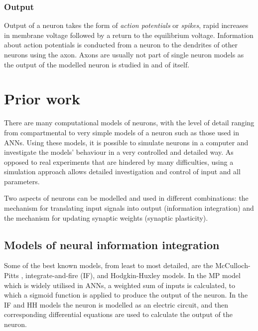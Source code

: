 \documentclass[a4paper,12pt]{report}
\theoremstyle{definition}
\begin{document}
\subsubsection{Output}

Output of a neuron takes the form of \emph{action potentials} or \emph{spikes}, rapid increases in membrane voltage followed by a return to the equilibrium voltage. Information about action potentials is conducted from a neuron to the dendrites of other neurons using the axon. Axons are usually not part of single neuron models as the output of the modelled neuron is studied in and of itself.

\section{Prior work}


There are many computational models of neurons, with the level of detail ranging from compartmental to very simple models of a neuron such as those used in ANNs. Using these models, it is possible to simulate neurons in a computer and investigate the models' behaviour in a very controlled and detailed way. As opposed to real experiments that are hindered by many difficulties, using a simulation approach allows detailed investigation and control of input and all parameters.

Two aspects of neurons can be modelled and used in different combinations: the mechanism for translating input signals into output (information integration) and the mechanism for updating synaptic weights (synaptic plasticity).


\subsection{Models of neural information integration}
\label{modelsofintegration}

Some of the best known models, from least to most detailed, are the McCulloch-Pitts \cite{mcculloch1943logical}, integrate-and-fire (IF), and Hodgkin-Huxley \cite{hodgkin1952quantitative} models. In the MP model which is widely utilised in ANNs, a weighted sum of inputs is calculated, to which a sigmoid function is applied to produce the output of the neuron. In the IF and HH models the neuron is modelled as an electric circuit, and then corresponding differential equations are used to calculate the output of the neuron.
\end{document}
